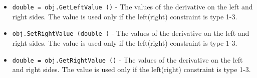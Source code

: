 \begin{itemize}
\item  \verb|double = obj.GetLeftValue ()| -  The values of the derivative on the left and right sides. The value
 is used only if the left(right) constraint is type 1-3.

\item  \verb|obj.SetRightValue (double )| -  The values of the derivative on the left and right sides. The value
 is used only if the left(right) constraint is type 1-3.

\item  \verb|double = obj.GetRightValue ()| -  The values of the derivative on the left and right sides. The value
 is used only if the left(right) constraint is type 1-3.

\end{itemize}
